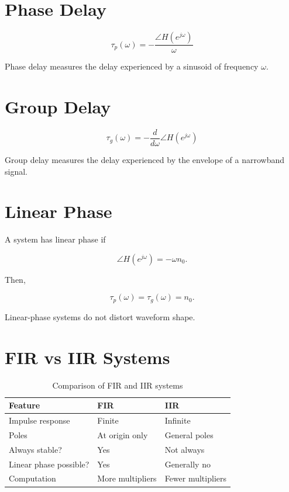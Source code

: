 \section{Phase Delay}

\[
\boxed{
\tau_p(\omega)=
-\frac{\angle H(e^{j\omega})}{\omega}
}
\]

Phase delay measures the delay experienced by a sinusoid of frequency \(\omega\).


\section{Group Delay}

\[
\boxed{
\tau_g(\omega)=
-\frac{d}{d\omega}\angle H(e^{j\omega})
}
\]

Group delay measures the delay experienced by the envelope of a narrowband signal.


\section{Linear Phase}

A system has linear phase if

\[
\angle H(e^{j\omega})=-\omega n_0.
\]

Then,

\[
\tau_p(\omega)=\tau_g(\omega)=n_0.
\]

Linear-phase systems do not distort waveform shape.


\section{FIR vs IIR Systems}

\begin{table}[H]
\centering
\caption{Comparison of FIR and IIR systems}
\begin{tabular}{|p{5cm}|p{3cm}|p{3cm}|}
\hline
\textbf{Feature} & \textbf{FIR} & \textbf{IIR}\\
\hline
Impulse response & Finite & Infinite\\
\hline
Poles & At origin only & General poles\\
\hline
Always stable? & Yes & Not always\\
\hline
Linear phase possible? & Yes & Generally no\\
\hline
Computation & More multipliers & Fewer multipliers\\
\hline
\end{tabular}
\end{table}

